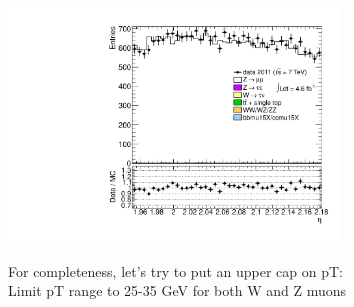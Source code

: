 {\includegraphics[width=0.66\textwidth]{dates/20130306/figures/both/Zpt35_10_A_stack_lN_eta_ALL.pdf} 
\cole
}

 {
For completeness, let's try to put an upper cap on pT: \\
Limit pT range to 25-35 GeV for both W and Z muons
}
